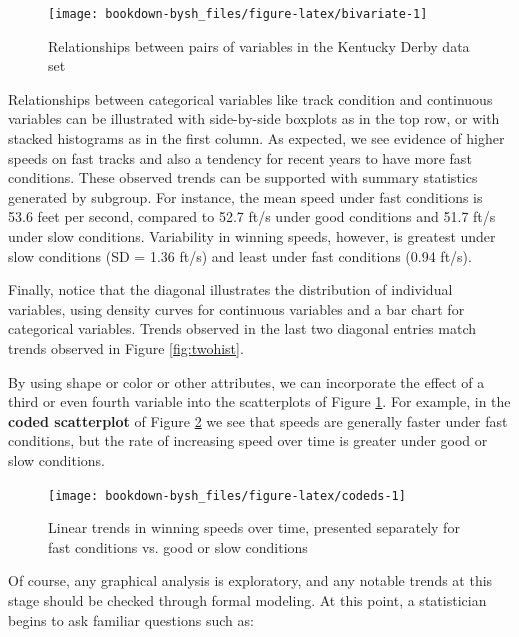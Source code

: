 \documentclass[
]{krantz}
\begin{document}
\begin{figure}

{\centering \texttt{[image: bookdown-bysh\_files/figure-latex/bivariate-1]} 

}

\caption{Relationships between pairs of variables in the Kentucky Derby data set}\label{fig:bivariate}
\end{figure}

Relationships between categorical variables like track condition and continuous variables can be illustrated with side-by-side boxplots as in the top row, or with stacked histograms as in the first column. As expected, we see evidence of higher speeds on fast tracks and also a tendency for recent years to have more fast conditions. These observed trends can be supported with summary statistics generated by subgroup. For instance, the mean speed under fast conditions is 53.6 feet per second, compared to 52.7 ft/s under good conditions and 51.7 ft/s under slow conditions. Variability in winning speeds, however, is greatest under slow conditions (SD = 1.36 ft/s) and least under fast conditions (0.94 ft/s).

Finally, notice that the diagonal illustrates the distribution of individual variables, using density curves for continuous variables and a bar chart for categorical variables. Trends observed in the last two diagonal entries match trends observed in Figure \ref{fig:twohist}.

By using shape or color or other attributes, we can incorporate the effect of a third or even fourth variable into the scatterplots of Figure \ref{fig:bivariate}. For example, in the \textbf{coded scatterplot}  of Figure \ref{fig:codeds} we see that speeds are generally faster under fast conditions, but the rate of increasing speed over time is greater under good or slow conditions.

\begin{figure}

{\centering \texttt{[image: bookdown-bysh\_files/figure-latex/codeds-1]} 

}

\caption{Linear trends in winning speeds over time, presented separately for fast conditions vs. good or slow conditions}\label{fig:codeds}
\end{figure}

Of course, any graphical analysis is exploratory, and any notable trends at this stage should be checked through formal modeling. At this point, a statistician begins to ask familiar questions such as:
\end{document}

